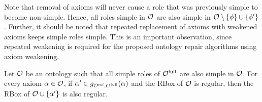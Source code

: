 Note that removal of axioms will never cause a role that was previously simple to become non-simple. Hence, all roles simple in $\mathcal{O}$ are also simple in $\mathcal{O} \setminus \{ \phi \} \cup\{ \phi' \}$. Further, it should be noted that repeated replacement of axioms with weakened axioms keeps simple roles simple. This is an important observation, since repeated weakening is required for the proposed ontology repair algorithms using axiom weakening.

\begin{lemma} \label{lem:regularity}
Let $\mathcal{O}$ be an ontology such that all simple roles of ${\mathcal{O}^\textnormal{full}}$ are also simple in $\mathcal{O}$. For every axiom $\alpha \in \mathcal{O}$, if $\alpha' \in g_{{\mathcal{O}^\textnormal{ref}},{\mathcal{O}^\textnormal{full}}}(\alpha)$ and the RBox of $\mathcal{O}$ is regular, then the RBox of $\mathcal{O} \cup \{ \alpha' \}$ is also regular.
\end{lemma}

